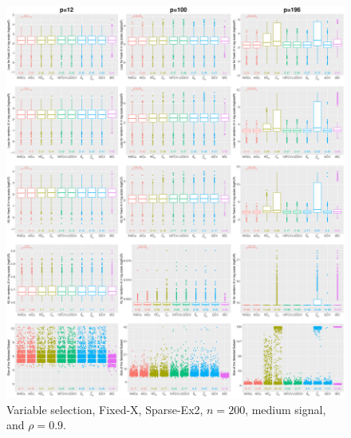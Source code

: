 \begin{figure}[!ht]
\centering
\includegraphics[width=\textwidth]{figures/supplement/fixedx/subset_selection/Sparse-Ex2_n200_msnr_rho09.eps}
\caption{Variable selection, Fixed-X, Sparse-Ex2, $n=200$, medium signal, and $\rho=0.9$.}
\end{figure}
\clearpage
